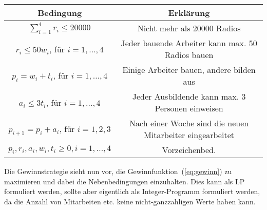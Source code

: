 \documentclass[11pt,a4paper,ngerman]{article}
\begin{document}
\begin{tabular}{c|c}
Bedingung & Erklärung \\
\hline \hline
$\sum_{i=1}^4 r_i \leq 20000$ & Nicht mehr als 20000 Radios\\
$r_i \leq 50w_i$, für $i = 1,\ldots,4$ & Jeder bauende Arbeiter kann max. 50 Radios bauen \\
$p_i = w_i + t_i$, für $i = 1,\ldots,4$ & Einige Arbeiter bauen, andere bilden aus \\
$a_i \leq 3 t_i$, für $i = 1,\ldots,4$ & Jeder Ausbildende kann max. 3 Personen einweisen \\
$p_{i+1} = p_i + a_i$, für $i = 1,2,3$ & Nach einer Woche sind die neuen Mitarbeiter eingearbeitet \\
\hline
$p_i, r_i, a_i, w_i, t_i \geq 0, i = 1,\ldots,4$ & Vorzeichenbed. 
\end{tabular}
$\quad$ \\
Die Gewinnstrategie sieht nun vor, die Gewinnfunktion~(\ref{eq:gewinn}) zu maximieren
und dabei die Nebenbedingungen einzuhalten. Dies kann als LP formuliert werden, sollte aber
eigentlich als Integer-Programm formuliert werden, da die Anzahl von Mitarbeiten etc. keine
nicht-ganzzahligen Werte haben kann.
\end{document}
